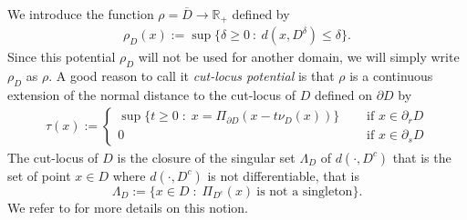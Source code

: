 \documentclass[reqno,11pt]{amsart}
\theoremstyle{definition}
\numberwithin{equation}{section}
\newcommand{\RR}{\mathbb{R}}
\newcommand{\1}{{{\bf 1}\kern-0,28em\rm l}}
\def\sepa{\; : \;}
\begin{document}
We introduce the function $\rho=  \overline{D} \to \RR_+$ defined by
\begin{align}\label{def:rho}
\rho_D(x) := \sup\{ \delta\ge 0 \ : \ d(x,D^\delta) \le \delta\}.
\end{align}
Since this potential $\rho_D$ will not be used for another domain, we will simply write $\rho_D$ as $\rho$. 
A good reason to call it \emph{cut-locus potential} is that $\rho$ is a continuous extension of  the normal distance to the cut-locus of $D$ 
 defined on $\partial D$ by
\begin{align}\label{cut-dis} 
\tau(x):= \begin{cases}
\sup \{t\ge 0 \sepa  x= \Pi_{\partial D} (x-t \nu_D(x))  \}\quad & \text{ if $x\in \partial_r D$} \\
0 & \text{ if $x\in \partial_s D$}
\end{cases}
\end{align} 
The cut-locus of $D$ is the closure of the  singular set $\Lambda_D$ of $d(\cdot,D^c)$ 
that is the set of point $x\in D$ where $d(\cdot, D^c)$ is not differentiable, that is
$$\Lambda_D:=\{x\in D \sepa \Pi_{D^c}(x) \ \text {is not a singleton}\}.$$ 
 We refer to \cite{crasta2016cutlocus, crasta2016characterization, crasta2017geometric, crasta2015dirichlet} for more details on this notion.
\end{document}
